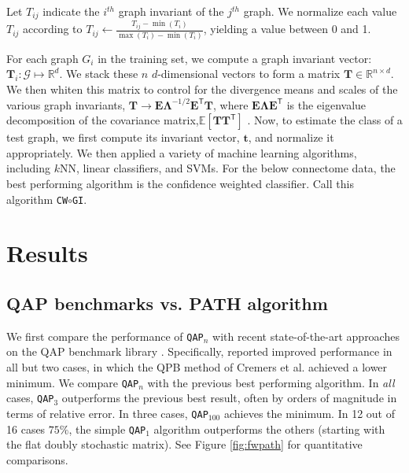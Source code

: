 \documentclass{article} %
\newcommand{\T}{^{\ensuremath{\mathsf{T}}}}           %
\newcommand{\EE}{\mathbb{E}}           %
\providecommand{\mc}[1]{\mathcal{#1}}
\providecommand{\mb}[1]{\boldsymbol{#1}}
\newcommand{\Real}{\mathbb{R}}
\newcommand{\qapa}{\texttt{QAP}$_1$ }
\newcommand{\qapn}{\texttt{QAP$_n$} }
\newcommand{\qapb}{\texttt{QAP$_{100}$} }
\begin{document}
Let $T_{ij}$ indicate the $i^{th}$ graph invariant of the $j^{th}$ graph.  We normalize each value $T_{ij}$ according to $ T_{ij} \leftarrow \frac{T_{ij} - \min(T_i)}{\max(T_i) - \min(T_i)}$,
yielding a value between 0 and 1.

For each graph $G_i$ in the training set, we compute a graph invariant vector: $\mb{T}_i: \mc{G} \mapsto \Real^d$.  We stack these $n$ $d$-dimensional vectors to form a matrix $\mb{T} \in \Real^{n \times d}$. We then whiten this matrix to control for the divergence means and scales of the various graph invariants, $\mb{T} \rightarrow \mb{E}\mb{\Lambda}^{-1/2}\mb{E}\T \mb{T}$, where $\mb{E}\mb{\Lambda}\mb{E}\T$ is the eigenvalue decomposition of the covariance matrix,$\EE[\mb{T}\mb{T}\T]$ \cite{Hyvarinen2000}.  Now, to estimate the class of a test graph, we first compute its invariant vector, $\mb{t}$, and normalize it appropriately.  We then applied a variety of machine learning algorithms, including $k$NN, linear classifiers, and SVMs.  For the below connectome data, the best performing algorithm is the confidence weighted classifier.  Call this algorithm \texttt{CW}$\circ$\texttt{GI}.




\section{Results}

\subsection{QAP benchmarks vs. PATH algorithm}

We first compare the performance of \qapn with recent state-of-the-art approaches on the QAP benchmark library \cite{Burkard1997}.  Specifically, \cite{Zaslavskiy2009} reported improved performance in all but two cases, in which the QPB method of Cremers et al. \cite{Schellewald2001} achieved a lower minimum.  We compare \qapn with the previous best performing algorithm.  In \emph{all} cases, \texttt{QAP}$_3$ outperforms the previous best result, often by orders of magnitude in terms of relative error. In three cases, \qapb achieves the minimum.  In 12 out of 16 cases $75\%$, the simple \qapa algorithm outperforms the others (starting with the flat doubly stochastic matrix).  See Figure \ref{fig:fwpath} for quantitative comparisons.
\end{document}
